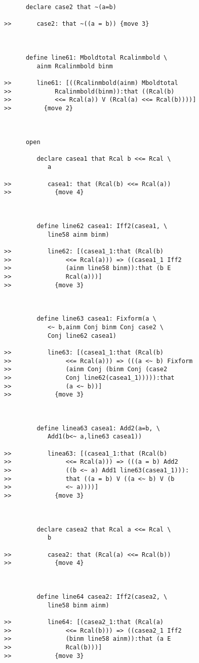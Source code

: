\documentclass[12pt]{article}
\begin{document}
\begin{verbatim}
      declare case2 that ~(a=b)

>>       case2: that ~((a = b)) {move 3}



      define line61: Mboldtotal Rcalinmbold \
         ainm Rcalinmbold binm

>>       line61: [((Rcalinmbold(ainm) Mboldtotal
>>            Rcalinmbold(binm)):that ((Rcal(b)
>>            <<= Rcal(a)) V (Rcal(a) <<= Rcal(b))))]
>>         {move 2}



      open

         declare casea1 that Rcal b <<= Rcal \
            a

>>          casea1: that (Rcal(b) <<= Rcal(a))
>>            {move 4}



         define line62 casea1: Iff2(casea1, \
            line58 ainm binm)

>>          line62: [(casea1_1:that (Rcal(b)
>>               <<= Rcal(a))) => ((casea1_1 Iff2
>>               (ainm line58 binm)):that (b E
>>               Rcal(a)))]
>>            {move 3}



         define line63 casea1: Fixform(a \
            <~ b,ainm Conj binm Conj case2 \
            Conj line62 casea1)

>>          line63: [(casea1_1:that (Rcal(b)
>>               <<= Rcal(a))) => (((a <~ b) Fixform
>>               (ainm Conj (binm Conj (case2
>>               Conj line62(casea1_1))))):that
>>               (a <~ b))]
>>            {move 3}



         define linea63 casea1: Add2(a=b, \
            Add1(b<~ a,line63 casea1))

>>          linea63: [(casea1_1:that (Rcal(b)
>>               <<= Rcal(a))) => (((a = b) Add2
>>               ((b <~ a) Add1 line63(casea1_1))):
>>               that ((a = b) V ((a <~ b) V (b
>>               <~ a))))]
>>            {move 3}



         declare casea2 that Rcal a <<= Rcal \
            b

>>          casea2: that (Rcal(a) <<= Rcal(b))
>>            {move 4}



         define line64 casea2: Iff2(casea2, \
            line58 binm ainm)

>>          line64: [(casea2_1:that (Rcal(a)
>>               <<= Rcal(b))) => ((casea2_1 Iff2
>>               (binm line58 ainm)):that (a E
>>               Rcal(b)))]
>>            {move 3}




\end{verbatim}
\end{document}
